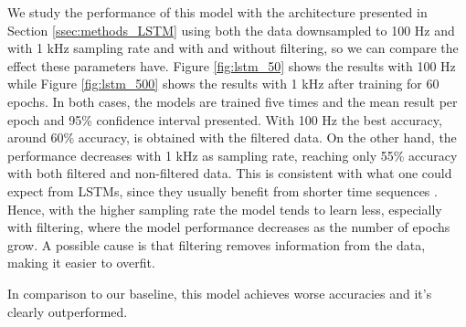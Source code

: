 \documentclass[10pt,conference,compsocconf]{IEEEtran}
\begin{document}
    We study the performance of this model with the architecture presented in Section \ref{ssec:methods_LSTM} using both the data downsampled to 100 Hz and with 1 kHz sampling rate and with and without filtering, so we can compare the effect these parameters have. Figure \ref{fig:lstm_50} shows the results with 100 Hz while Figure \ref{fig:lstm_500} shows the results with 1 kHz after training for 60 epochs. In both cases, the models are trained five times and the mean result per epoch and 95\% confidence interval presented. With 100 Hz the best accuracy, around 60\% accuracy, is obtained with the filtered data. On the other hand, the performance decreases with 1 kHz as sampling rate, reaching only 55\% accuracy with both filtered and non-filtered data. This is consistent with what one could expect from LSTMs, since they usually benefit from shorter time sequences \cite{LSTM}. Hence, with the higher sampling rate the model tends to learn less, especially with filtering, where the model performance decreases as the number of epochs grow. A possible cause is that filtering removes information from the data, making it easier to overfit. 
    
    In comparison to our baseline, this model achieves worse accuracies and it's clearly outperformed.
    
\end{document}
